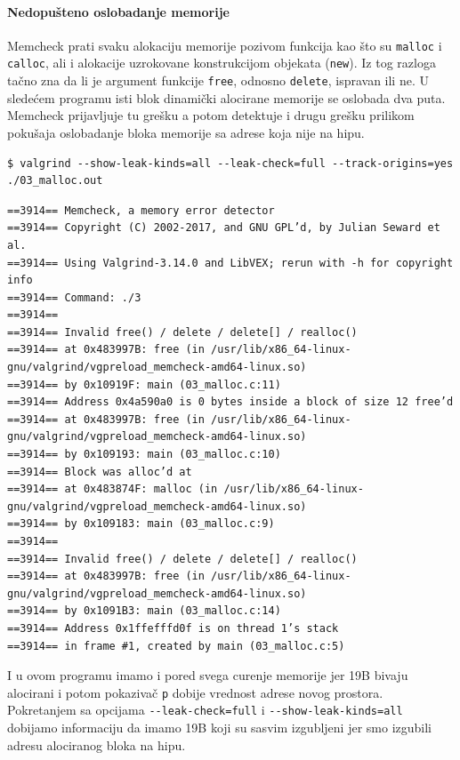 \paragraph{Nedopušteno oslobadanje memorije}\label{nedopuux161teno-oslobadanje-memorije}

Memcheck prati svaku alokaciju memorije pozivom funkcija kao što su \texttt{malloc} i \texttt{calloc}, ali i alokacije uzrokovane konstrukcijom objekata (\texttt{new}). Iz tog razloga tačno zna da li je argument funkcije \texttt{free}, odnosno \texttt{delete}, ispravan ili ne. U sledećem programu isti blok dinamički alocirane memorije se oslobada dva puta. Memcheck prijavljuje tu grešku a potom detektuje i drugu grešku prilikom pokušaja oslobadanje bloka memorije sa adrese koja nije na hipu.

\begin{verbatim}
$ valgrind --show-leak-kinds=all --leak-check=full --track-origins=yes ./03_malloc.out
\end{verbatim}

\begin{verbatim}
==3914== Memcheck, a memory error detector
==3914== Copyright (C) 2002-2017, and GNU GPL’d, by Julian Seward et al.
==3914== Using Valgrind-3.14.0 and LibVEX; rerun with -h for copyright info
==3914== Command: ./3
==3914==
==3914== Invalid free() / delete / delete[] / realloc()
==3914== at 0x483997B: free (in /usr/lib/x86_64-linux-gnu/valgrind/vgpreload_memcheck-amd64-linux.so)
==3914== by 0x10919F: main (03_malloc.c:11)
==3914== Address 0x4a590a0 is 0 bytes inside a block of size 12 free’d
==3914== at 0x483997B: free (in /usr/lib/x86_64-linux-gnu/valgrind/vgpreload_memcheck-amd64-linux.so)
==3914== by 0x109193: main (03_malloc.c:10)
==3914== Block was alloc’d at
==3914== at 0x483874F: malloc (in /usr/lib/x86_64-linux-gnu/valgrind/vgpreload_memcheck-amd64-linux.so)
==3914== by 0x109183: main (03_malloc.c:9)
==3914==
==3914== Invalid free() / delete / delete[] / realloc()
==3914== at 0x483997B: free (in /usr/lib/x86_64-linux-gnu/valgrind/vgpreload_memcheck-amd64-linux.so)
==3914== by 0x1091B3: main (03_malloc.c:14)
==3914== Address 0x1ffefffd0f is on thread 1’s stack
==3914== in frame #1, created by main (03_malloc.c:5)
\end{verbatim}

I u ovom programu imamo i pored svega curenje memorije jer 19B bivaju alocirani i potom pokazivač \texttt{p} dobije vrednost adrese novog prostora. Pokretanjem sa opcijama \texttt{-\/-leak-check=full} i \texttt{-\/-show-leak-kinds=all} dobijamo informaciju da imamo 19B koji su sasvim izgubljeni jer smo izgubili adresu alociranog bloka na hipu.

